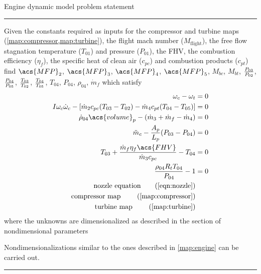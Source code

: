 \begin{table}
\centering
    \caption{Engine dynamic model problem statement}
    \label{model:dynamic}
\begin{minipage}{0.7\textwidth}
    \hrule\vspace{2pt}

    Given the constants required as inputs for the compressor and turbine maps (\cref{map:compressor,map:turbine}), 
    the flight mach number ($M_\text{flight}$), the free flow stagnation temperature ($T_{01}$) and pressure ($P_{01}$), 
    the \acf{FHV}, the combustion efficiency ($\eta_f$),
    the specific heat of clean air ($c_{pc}$) and combustion products ($c_{pt}$) \\ 
    find $\acs{MFP}_2$, $\acs{MFP}_3$, $\acs{MFP}_4$, $\acs{MFP}_5$, $M_{bc}$, $M_{bt}$, $\frac{P_{03}}{P_{02}}$, $\frac{P_{04}}{P_{05}}$, $\frac{T_{03}}{T_{02}}$, $\frac{T_{04}}{T_{05}}$, $T_{04}$, $P_{04}$, $\rho_{04}$, $\dot{m}_f$
    which satisfy
\begin{align}
    \omega_c - \omega_t &= 0 \label{eqn:dynamic:rotation} \\
    I \omega_c\dot{\omega}_c - [\dot{m}_2 c_{pc} (T_{03}-T_{02}) - \dot{m}_4 c_{pt}(T_{04}-T_{05})] &= 0 \label{eqn:dynamic:energy}\\
    \dot{\rho}_{04}\acs{volume}_p - (\dot{m}_3 + \dot{m}_f - \dot{m}_4) &= 0 \label{eqn:dynamic:mass} \\
    \ddot{m}_c - \frac{A_p}{L_p}(P_{03}-P_{04}) &=0 \label{eqn:dynamic:momentum} \\
    T_{03} + \frac{\dot{m}_f \eta_f \acs{FHV}}{\dot{m}_3 c_{pc}} - T_{04} &= 0 \label{eqn:dynamic:burn} \\
    \frac{\rho_{04} R_t T_{04}}{P_{04}}  - 1 &= 0\\
    \text{nozzle equation} \tag{\cref{eqn:nozzle}} \\
    \text{compressor map } \tag{\cref{map:compressor}} \\
    \text{turbine map    } \tag{\cref{map:turbine}}
\end{align}
   where the unknowns are dimensionalized as described in the section of nondimensional parameters

   Nondimensionalizations similar to the ones described in \cref{map:engine} can be carried out.

    \vspace{2pt}\hrule
\end{minipage}
\end{table}

